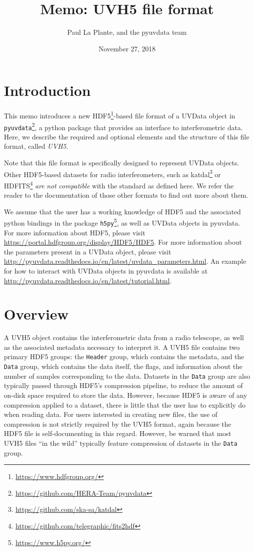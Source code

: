 \documentclass[11pt, oneside]{article}
\title{Memo: UVH5 file format}
\author{Paul La Plante, and the pyuvdata team}
\date{November 27, 2018}
\begin{document}
\maketitle
\tableofcontents
\section{Introduction}
\label{sec:intro}
This memo introduces a new HDF5\footnote{\url{https://www.hdfgroup.org/}}-based
file format of a UVData object in
\verb+pyuvdata+\footnote{\url{https://github.com/HERA-Team/pyuvdata}}, a python
package that provides an interface to interferometric data. Here, we describe
the required and optional elements and the structure of this file format, called
\textit{UVH5}.

Note that this file format is specifically designed to represent UVData
objects. Other HDF5-based datasets for radio interferometers, such as
katdal\footnote{\url{https://github.com/ska-sa/katdal}} or
HDFITS\footnote{\url{https://github.com/telegraphic/fits2hdf}} \textit{are not
  compatible} with the standard as defined here. We refer the reader to the
documentation of those other formats to find out more about them.

We assume that the user has a working knowledge of HDF5 and the associated
python bindings in the package \verb+h5py+\footnote{\url{https://www.h5py.org/}}, as
well as UVData objects in pyuvdata. For more information about HDF5, please
visit \url{https://portal.hdfgroup.org/display/HDF5/HDF5}. For more information
about the parameters present in a UVData object, please visit
\url{http://pyuvdata.readthedocs.io/en/latest/uvdata_parameters.html}. An
example for how to interact with UVData objects in pyuvdata is available at
\url{http://pyuvdata.readthedocs.io/en/latest/tutorial.html}.

\section{Overview}
\label{sec:overview}
A UVH5 object contains the interferometric data from a radio telescope, as well
as the associated metadata necessary to interpret it. A UVH5 file contains two
primary HDF5 groups: the \verb+Header+ group, which contains the metadata, and
the \verb+Data+ group, which contains the data itself, the flags, and
information about the number of samples corresponding to the data. Datasets in
the \verb+Data+ group are also typically passed through HDF5's compression
pipeline, to reduce the amount of on-disk space required to store the data.
However, because HDF5 is aware of any compression applied to a dataset, there is
little that the user has to explicitly do when reading data. For users
interested in creating new files, the use of compression is not strictly
required by the UVH5 format, again because the HDF5 file is self-documenting in
this regard. However, be warned that most UVH5 files ``in the wild'' typically
feature compression of datasets in the \verb+Data+ group.
\end{document}
